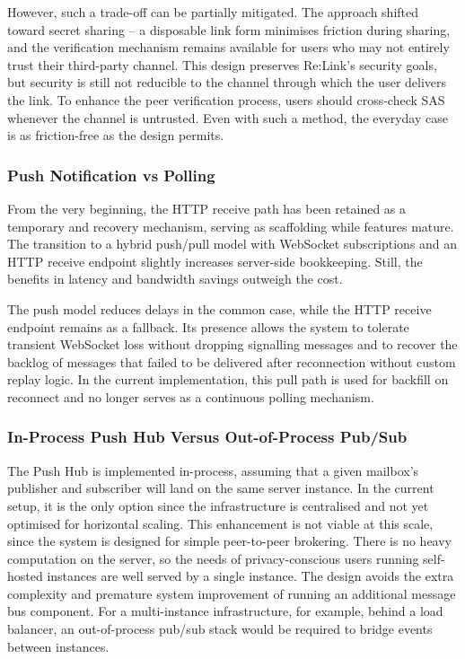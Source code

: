 \documentclass[12pt,a4paper]{article}
\begin{document}
However, such a trade-off can be partially mitigated. The approach shifted toward secret sharing – a disposable link form minimises friction during sharing, and the verification mechanism remains available for users who may not entirely trust their third-party channel. This design preserves Re:Link’s security goals, but security is still not reducible to the channel through which the user delivers the link. To enhance the peer verification process, users should cross-check SAS whenever the channel is untrusted. Even with such a method, the everyday case is as friction-free as the design permits.

\subsubsection{Push Notification vs Polling}

From the very beginning, the HTTP receive path has been retained as a temporary and recovery mechanism, serving as scaffolding while features mature. The transition to a hybrid push/pull model with WebSocket subscriptions and an HTTP receive endpoint slightly increases server-side bookkeeping. Still, the benefits in latency and bandwidth savings outweigh the cost.

The push model reduces delays in the common case, while the HTTP receive endpoint remains as a fallback. Its presence allows the system to tolerate transient WebSocket loss without dropping signalling messages and to recover the backlog of messages that failed to be delivered after reconnection without custom replay logic. In the current implementation, this pull path is used for backfill on reconnect and no longer serves as a continuous polling mechanism.

\subsubsection{In-Process Push Hub Versus Out-of-Process Pub/Sub}

The Push Hub is implemented in-process, assuming that a given mailbox’s publisher and subscriber will land on the same server instance. In the current setup, it is the only option since the infrastructure is centralised and not yet optimised for horizontal scaling. This enhancement is not viable at this scale, since the system is designed for simple peer-to-peer brokering. There is no heavy computation on the server, so the needs of privacy-conscious users running self-hosted instances are well served by a single instance. The design avoids the extra complexity and premature system improvement of running an additional message bus component. For a multi-instance infrastructure, for example, behind a load balancer, an out-of-process pub/sub stack would be required to bridge events between instances.
\end{document}
